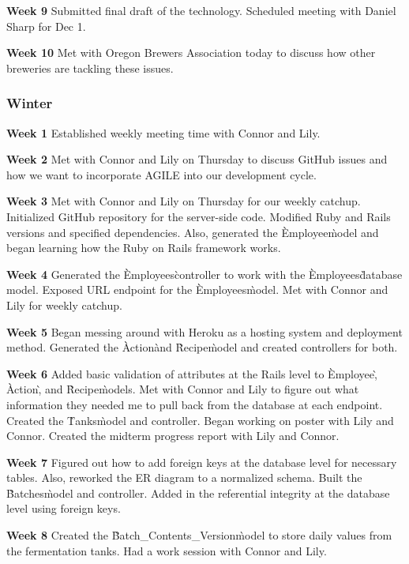 \noindent\medskip\textbf{Week 9}
Submitted final draft of the technology.
Scheduled meeting with Daniel Sharp for Dec 1.

\noindent\medskip\textbf{Week 10}
Met with Oregon Brewers Association today to discuss how other breweries are tackling these issues.


\subsubsection{Winter}
\hfill\break
\noindent\medskip\textbf{Week 1}
Established weekly meeting time with Connor and Lily.

\noindent\medskip\textbf{Week 2}
Met with Connor and Lily on Thursday to discuss GitHub issues and how we want to incorporate AGILE into our development cycle.

\noindent\medskip\textbf{Week 3}
Met with Connor and Lily on Thursday for our weekly catchup.
Initialized GitHub repository for the server-side code.
Modified Ruby and Rails versions and specified dependencies.
Also, generated the \`Employee\` model and began learning how the Ruby on Rails framework works.

\noindent\medskip\textbf{Week 4}
Generated the \`Employees\` controller to work with the \`Employees\` database model.
Exposed URL endpoint for the \`Employees\` model.
Met with Connor and Lily for weekly catchup.

\noindent\medskip\textbf{Week 5}
Began messing around with Heroku as a hosting system and deployment method.
Generated the \`Action\` and \`Recipe\` model and created controllers for both.

\noindent\medskip\textbf{Week 6}
Added basic validation of attributes at the Rails level to \`Employee\`, \`Action\`, and \`Recipe\` models.
Met with Connor and Lily to figure out what information they needed me to pull back from the database at each endpoint.
Created the \`Tanks\` model and controller.
Began working on poster with Lily and Connor.
Created the midterm progress report with Lily and Connor.

\noindent\medskip\textbf{Week 7}
Figured out how to add foreign keys at the database level for necessary tables.
Also, reworked the ER diagram to a normalized schema.
Built the \`Batches\` model and controller.
Added in the referential integrity at the database level using foreign keys.

\noindent\medskip\textbf{Week 8}
Created the \`Batch\_Contents\_Version\` model to store daily values from the fermentation tanks.
Had a work session with Connor and Lily.

